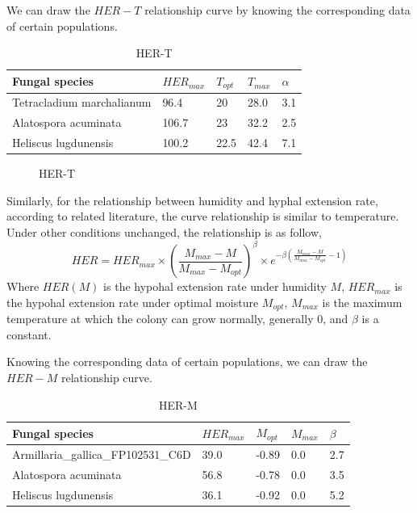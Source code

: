 \documentclass{mcmthesis}
\begin{document}
We can draw the $HER-T$ relationship curve by knowing the corresponding data of certain populations.
\begin{table}[h]
	\centering
	\caption{HER-T}
	\begin{tabular}{p{}p{}p{}p{}p{}}
		\hline
		Fungal species&$HER_{max}$&$T_{opt}$&$T_{max}$&$\alpha$ \\
		\hline
		Tetracladium marchalianum & 96.4 & 20 & 28.0 & 3.1\\
		Alatospora acuminata & 106.7 & 23 & 32.2 &2.5\\
		Heliscus lugdunensis & 100.2 & 22.5 & 42.4 &7.1\\
		\hline
	\end{tabular}
\end{table}
\begin{figure}[h]
	\caption{HER-T}
\end{figure}

Similarly, for the relationship between humidity and hyphal extension rate, according to related literature, the curve relationship is similar to temperature. Under other conditions unchanged, the relationship is as follow,
\begin{equation}
	HER=HER_{max}{\times}(\frac{M_{max}-M}{M_{max}-M_{opt}})^{\beta}{\times}e^{-{\beta}(\frac{M_{max}-M}{M_{max}-M_{opt}}-1)}
\end{equation} 
Where $HER(M)$ is the hypohal extension rate under humidity $M$, $HER_{max}$ is the hypohal extension rate under optimal moisture $M_{opt}$, $M_{max}$ is the maximum temperature at which the colony can grow normally, generally $0$, and $\beta$ is a constant. 

Knowing the corresponding data of certain populations, we can draw the $HER-M$ relationship curve.
\begin{table}[h]
	\centering
	\caption{HER-M}
	\begin{tabular}{p{}p{}p{}p{}p{}}
		\hline
		Fungal species&$HER_{max}$&$M_{opt}$&$M_{max}$&$\beta$ \\
		\hline
		Armillaria\_gallica\_FP102531\_C6D & 39.0 & -0.89 & 0.0 & 2.7\\
		Alatospora acuminata & 56.8 & -0.78 & 0.0 &3.5\\
		Heliscus lugdunensis & 36.1 & -0.92 & 0.0 &5.2\\
		\hline
	\end{tabular}
\end{table}
\end{document}
